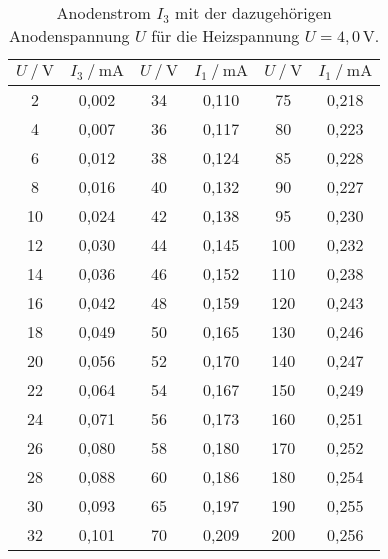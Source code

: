 \begin{table}[H]
    \centering
    \caption{Anodenstrom $I_3$ mit der dazugehörigen Anodenspannung $U$ für die Heizspannung $U = 4,0 \, \unit{\volt} $.}
    \label{tab:kennlini1_3}
    \begin{tabular}{S S S S S[table-format=3.1] S}
      \toprule
      {$U \mathbin{/} \unit{\volt}$} & {$I_3 \mathbin{/} \unit{\milli\ampere}$} & {$U \mathbin{/} \unit{\volt}$} & {$I_1 \mathbin{/} \unit{\milli\ampere}$} & {$U \mathbin{/} \unit{\volt}$} & {$I_1 \mathbin{/} \unit{\milli\ampere}$}  \\
      \midrule
        {2}  &    { 0,002} & {34}  &    {0,110} & {75 }    & {0,218} \\
        {4}  &    { 0,007} & {36}  &    {0,117} & {80 }    & {0,223} \\
        {6}  &    { 0,012} & {38}  &    {0,124} & {85 }    & {0,228} \\
        {8}  &    { 0,016} & {40}  &    {0,132} & {90 }    & {0,227} \\
        {10}  &    {0,024} & {42}  &    {0,138} & {95 }    & {0,230} \\
        {12}  &    {0,030} & {44}  &    {0,145} & {100}    & {0,232} \\
        {14}  &    {0,036} & {46}  &    {0,152} & {110}    & {0,238} \\
        {16}  &    {0,042} & {48}  &    {0,159} & {120}    & {0,243} \\
        {18}  &    {0,049} & {50}  &    {0,165} & {130}    & {0,246} \\
        {20}  &    {0,056} & {52}  &    {0,170} & {140}    & {0,247} \\
        {22}  &    {0,064} & {54}  &    {0,167} & {150}    & {0,249} \\
        {24}  &    {0,071} & {56}  &    {0,173} & {160}    & {0,251} \\
        {26}  &    {0,080} & {58}  &    {0,180} & {170}    & {0,252} \\
        {28}  &    {0,088} & {60}  &    {0,186} & {180}    & {0,254} \\
        {30}  &    {0,093} & {65}  &    {0,197} & {190}    & {0,255} \\
        {32}  &    {0,101} & {70}  &    {0,209} & {200}    & {0,256} \\
      \bottomrule
    \end{tabular}
\end{table}


